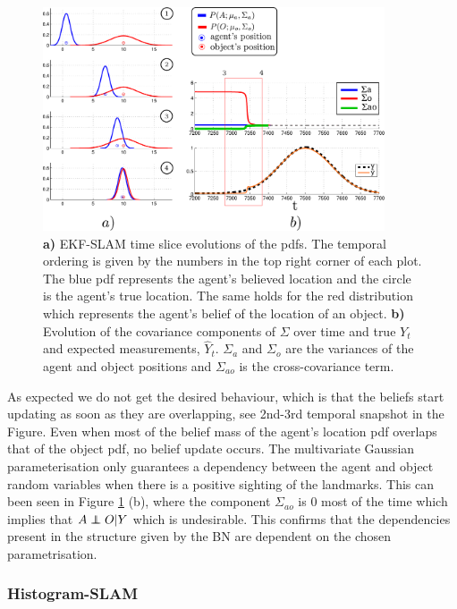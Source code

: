 \begin{figure}
\centering
 \includegraphics[width=0.9\textwidth]{./ch5-MLMF/Figures/Figure34.pdf}
\caption{\textbf{a)} EKF-SLAM time slice evolutions of the pdfs. 
The temporal ordering is given by the numbers in the top right corner of each plot.
The blue pdf represents the agent's believed location and the circle is the agent's true location. The same holds 
for the red distribution which represents the agent's belief of the location of an object.
\textbf{b)} Evolution of the covariance components of $\Sigma$ over time and true $Y_t$ and expected measurements,  $\hat{Y}_t$. 
$\Sigma_a$ and $\Sigma_o$ are the variances of the agent and object positions and $\Sigma_{ao}$ is the cross-covariance 
term.}
\label{fig:EKF-SLAM}
\end{figure}

As expected we do not get the desired behaviour, which is that the beliefs start updating as soon as they are overlapping, 
see 2nd-3rd temporal snapshot in the Figure. 
Even when most of the belief mass of the agent's location pdf overlaps that of the object pdf, no belief update occurs. 
The multivariate Gaussian parameterisation only guarantees a dependency between the agent and object random variables 
when there is a positive sighting of the landmarks.  This can been seen in Figure \ref{fig:EKF-SLAM} (b),
where the component $\Sigma_{ao}$ is 0 most of the time which implies that $A \independent O | Y$ which is undesirable. 
This confirms that the dependencies present in the structure given by the BN are dependent on the chosen parametrisation.

\subsubsection{Histogram-SLAM}\label{sec:Discrete}

